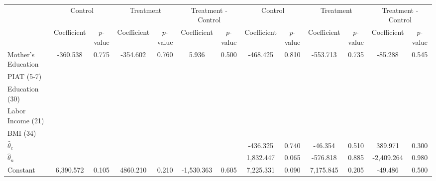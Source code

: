 \begin{tabular}{lcccccccccccc} \toprule
&\multicolumn{2}{c}{Control} & \multicolumn{2}{c}{Treatment} & \multicolumn{2}{c}{Treatment - Control} & \multicolumn{2}{c}{Control} & \multicolumn{2}{c}{Treatment} & \multicolumn{2}{c}{Treatment - Control} \\
 & Coefficient  & $p$-value  & Coefficient  & $p$-value & Coefficient  & $p$-value  & Coefficient  & $p$-value  & Coefficient  & $p$-value  & Coefficient  & $p$-value \\ \midrule
Mother's Education  &  -360.538 &     0.775 &  -354.602 &     0.760 &     5.936 &     0.500 &  -468.425 &     0.810 &  -553.713 &     0.735 &   -85.288 &     0.545 \\  
PIAT (5-7) &         &         &         &         &         &         &         &         &         &         &         &         \\  
Education (30) &         &         &         &         &         &         &         &         &         &         &         &         \\  
Labor Income (21)  &         &         &         &         &         &         &         &         &         &         &         &         \\  
BMI (34) &         &         &         &         &         &         &         &         &         &         &         &         \\  
$\hat{\theta}_{c}$ &         &         &         &         &         &         &  -436.325 &     0.740 &   -46.354 &     0.510 &   389.971 &     0.300 \\  
$\hat{\theta}_{n}$ &         &         &         &         &         &         &  1,832.447 &     0.065 &  -576.818 &     0.885 & -2,409.264 &     0.980 \\  
Constant &  6,390.572 &     0.105 &  4860.210 &     0.210 & -1,530.363 &     0.605 &  7,225.331 &     0.090 &  7,175.845 &     0.205 &   -49.486 &     0.500 \\ \bottomrule \end{tabular}
